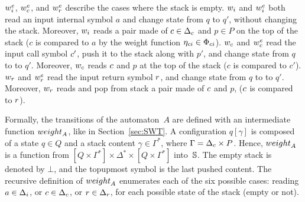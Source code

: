 \noindent
$\weiei$, $\weiec$, and $\weier$ describe the cases where the stack is empty.
%
\noindent
$\weii$ and $\weiei$ both read an input internal symbol $a$ and change state from $q$ to $q'$,
without changing the stack.
Moreover, $\weii$ reads a pair made of
${\call{c}} \in \Deltac$ and $p \in P$ on the top of the stack
($c$ is compared to $a$ by the weight function $\eta_\mathsf{ci} \in \Phici$).
%
\noindent
$\weic$ and $\weiec$ read the input call symbol $c'$,
push it to the stack along with $p'$, and change state from $q$ to to $q'$.
Moreover, $\weic$ reads ${c}$ and $p$ at the top of the stack
($c$ is compared to $c'$).
%
\noindent
$\weir$ and $\weier$ read the input return symbol $r$, and change state from $q$ to to $q'$.
Moreover, $\weir$ reads and pop from stack a pair made of $c$ and $p$,
($c$ is compared to $r$).

Formally, the transitions of the automaton~$A$ are defined
with an intermediate function $\weight_A$, like in Section~\ref{sec:SWT}.
%
A configuration $q[\gamma]$
is composed of a state $q \in Q$
and a stack content $\gamma \in \Gamma^*$,
where $\Gamma = \Deltac \times P$.
Hence, $\weight_A$ is a function from
$[Q \times \Gamma^*] \times \Delta^* \times [Q \times \Gamma^*]$ into~$\mathbb{S}$.
The empty stack is denoted by $\bot$, and the topupmost
symbol is the last pushed content.
%
The recursive definition of $\weight_A$
enumerates each of the six possible cases:
reading $a \in \Deltai$,
or $\call{c} \in \Deltac$, or $\return{r} \in \Deltar$,
for each possible state of the stack (empty or not).

